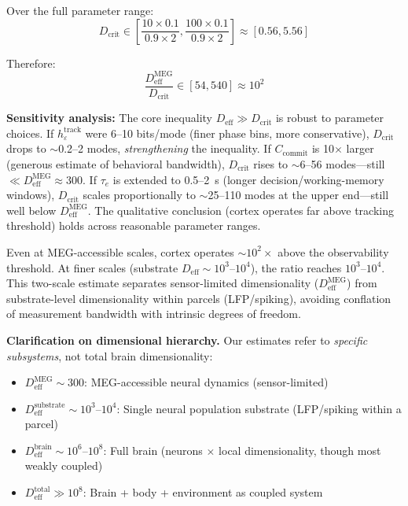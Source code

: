 \documentclass[12pt]{article}
\begin{document}
Over the full parameter range:
\begin{equation}
D_{\text{crit}} \in \left[\frac{10 \times 0.1}{0.9 \times 2}, \frac{100 \times 0.1}{0.9 \times 2}\right] \approx [0.56, 5.56]
\end{equation}

Therefore:
\begin{equation}
\frac{D_{\text{eff}}^{\text{MEG}}}{D_{\text{crit}}} \in [54, 540] \approx 10^{2}
\end{equation}

\textbf{Sensitivity analysis:} The core inequality $D_{\text{eff}} \gg D_{\text{crit}}$ is robust to parameter choices. If $h_\varepsilon^{\text{track}}$ were 6--10 bits/mode (finer phase bins, more conservative), $D_{\text{crit}}$ drops to $\sim$0.2--2 modes, \textit{strengthening} the inequality. If $C_{\text{commit}}$ is 10$\times$ larger (generous estimate of behavioral bandwidth), $D_{\text{crit}}$ rises to $\sim$6--56 modes---still $\ll D_{\text{eff}}^{\text{MEG}} \approx 300$. If $\tau_e$ is extended to 0.5--2~s (longer decision/working-memory windows), $D_{\text{crit}}$ scales proportionally to $\sim$25--110 modes at the upper end---still well below $D_{\text{eff}}^{\text{MEG}}$. The qualitative conclusion (cortex operates far above tracking threshold) holds across reasonable parameter ranges.

Even at MEG-accessible scales, cortex operates $\sim 10^{2}\times$ above the observability threshold. At finer scales (substrate $D_{\text{eff}} \sim 10^{3}$--$10^{4}$), the ratio reaches $10^{3}$--$10^{4}$. This two-scale estimate separates sensor-limited dimensionality ($D_{\text{eff}}^{\text{MEG}}$) from substrate-level dimensionality within parcels (LFP/spiking), avoiding conflation of measurement bandwidth with intrinsic degrees of freedom.

\textbf{Clarification on dimensional hierarchy.} Our estimates refer to \textit{specific subsystems}, not total brain dimensionality:
\begin{itemize}
\item $D_{\text{eff}}^{\text{MEG}} \sim 300$: MEG-accessible neural dynamics (sensor-limited)
\item $D_{\text{eff}}^{\text{substrate}} \sim 10^3$--$10^4$: Single neural population substrate (LFP/spiking within a parcel)
\item $D_{\text{eff}}^{\text{brain}} \sim 10^6$--$10^8$: Full brain (neurons $\times$ local dimensionality, though most weakly coupled)
\item $D_{\text{eff}}^{\text{total}} \gg 10^8$: Brain + body + environment as coupled system
\end{itemize}
\end{document}

